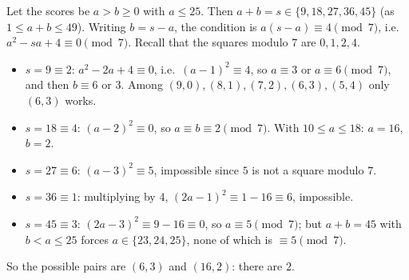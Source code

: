 Let the scores be $a>b\ge0$ with $a\le25$. Then $a+b=s\in\{9,18,27,36,45\}$ (as $1\le a+b\le49$). Writing $b=s-a$, the condition is $a(s-a)\equiv4\pmod7$, i.e.\ $a^2-sa+4\equiv0\pmod7$. Recall that the squares modulo $7$ are $0,1,2,4$.
\begin{itemize}
\item $s=9\equiv2$: $a^2-2a+4\equiv0$, i.e.\ $(a-1)^2\equiv4$, so $a\equiv3$ or $a\equiv6\pmod 7$, and then $b\equiv6$ or $3$. Among $(9,0),(8,1),(7,2),(6,3),(5,4)$ only $(6,3)$ works.
\item $s=18\equiv4$: $(a-2)^2\equiv0$, so $a\equiv b\equiv2\pmod7$. With $10\le a\le18$: $a=16$, $b=2$.
\item $s=27\equiv6$: $(a-3)^2\equiv5$, impossible since $5$ is not a square modulo $7$.
\item $s=36\equiv1$: multiplying by $4$, $(2a-1)^2\equiv1-16\equiv6$, impossible.
\item $s=45\equiv3$: $(2a-3)^2\equiv9-16\equiv0$, so $a\equiv5\pmod7$; but $a+b=45$ with $b<a\le25$ forces $a\in\{23,24,25\}$, none of which is $\equiv5\pmod7$.
\end{itemize}
So the possible pairs are $(6,3)$ and $(16,2)$: there are $\boxed{2}$.
